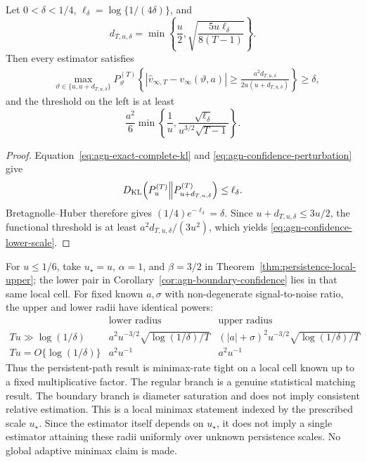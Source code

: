 \begin{corollary}
\label{cor:agn-boundary-confidence}
Let \(0<\delta<1/4\),
\(\ell_\delta=\log\{1/(4\delta)\}\), and
\begin{equation}
 d_{T,u,\delta}
 =\min\left\{
 \frac u2,
 \sqrt{\frac{5u\ell_\delta}{8(T-1)}}
 \right\}.
 \label{eq:agn-confidence-perturbation}
\end{equation}
Then every estimator satisfies
\begin{align}
 &\max_{\vartheta\in\{u,u+d_{T,u,\delta}\}}
 P_\vartheta^{(T)}
 \left\{
 |\widehat v_{\infty,T}-v_\infty(\vartheta,a)|
 \geq
 \frac{a^2d_{T,u,\delta}}
 {2u(u+d_{T,u,\delta})}
 \right\}
 \geq\delta,
 \label{eq:agn-confidence-lower}
\end{align}
and the threshold on the left is at least
\begin{equation}
 \frac{a^2}{6}
 \min\left\{
 \frac1u,
 \frac{\sqrt{\ell_\delta}}
 {u^{3/2}\sqrt{T-1}}
 \right\}.
 \label{eq:agn-confidence-lower-scale}
\end{equation}
\end{corollary}

\begin{proof}
Equation~\eqref{eq:agn-exact-complete-kl} and
\eqref{eq:agn-confidence-perturbation} give
\[
 D_{\rm KL}\!\left(P_u^{(T)}\middle\|
 P_{u+d_{T,u,\delta}}^{(T)}\right)
 \leq\ell_\delta.
\]
Bretagnolle--Huber therefore gives
\((1/4)e^{-\ell_\delta}=\delta\).  Since
\(u+d_{T,u,\delta}\leq3u/2\), the functional threshold is at least
\(a^2d_{T,u,\delta}/(3u^2)\), which yields
\eqref{eq:agn-confidence-lower-scale}.
\end{proof}

For \(u\leq1/6\), take \(u_\star=u\), \(\alpha=1\), and \(\beta=3/2\) in
Theorem~\ref{thm:persistence-local-upper}; the lower pair in
Corollary~\ref{cor:agn-boundary-confidence} lies in that same local cell.
For fixed known \(a,\sigma\) with non-degenerate signal-to-noise ratio, the
upper and lower radii have identical powers:
\[
 \begin{array}{c|c|c}
 &\text{lower radius}&\text{upper radius}\\\hline
 Tu\gg\log(1/\delta)
 &a^2u^{-3/2}\sqrt{\log(1/\delta)/T}
 &( |a|+\sigma)^2u^{-3/2}
   \sqrt{\log(1/\delta)/T}\\
 Tu=O\{\log(1/\delta)\}
 &a^2u^{-1}&a^2u^{-1}
 \end{array}
\]
Thus the persistent-path result is minimax-rate tight on a local cell known
up to a fixed multiplicative factor.  The regular branch is a genuine
statistical matching result.  The boundary branch is diameter saturation and
does not imply consistent relative estimation.  This is a local minimax
statement indexed by the prescribed scale \(u_\star\).  Since the estimator
itself depends on \(u_\star\), it does not imply a single estimator attaining
these radii uniformly over unknown persistence scales.  No global adaptive
minimax claim is made.

